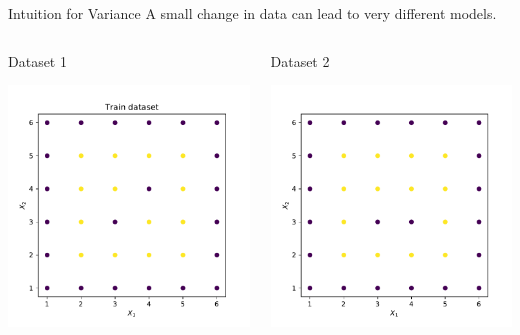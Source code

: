 \documentclass{beamer}
\begin{document}
	\begin{frame}{Intuition for Variance}
	A small change in data can lead to very different models.\\
	\vspace{1cm}
	\begin{columns}
		\begin{column}{0.5\textwidth}{\hspace{1.75cm} Dataset 1}
			\begin{center}
			\includegraphics[width = \textwidth]{dataset-2-train}
			\end{center}
		\end{column}
		\begin{column}{0.5\textwidth}{\hspace{1.75cm} Dataset 2}
			\begin{center}
			\includegraphics[width = \textwidth]{dataset-2-train-var}

\end{center}
\end{column}
\end{columns}
\end{frame}
\end{document}
